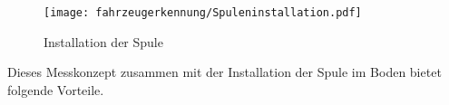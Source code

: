 \begin{figure}[H]
    \centering
    \texttt{[image: fahrzeugerkennung/Spuleninstallation.pdf]}
    \caption{Installation der Spule}
  \end{figure}
  Dieses Messkonzept zusammen mit der Installation der Spule im Boden bietet folgende Vorteile.

\begin{comment}

Bis auf die relative Permeabilität sind alle anderen Variablen konstant. Daraus lässt sich schlussfolgern, dass der magnetische
Fluss $\Phi$ anhand der Gleichung \ref{eq:phi} und \ref{eq:Rm} proportional zur relativen Permeabilität ist. 




\begin{equation} \label{iq:phi}
    \Phi \propto \mu_{r}
\end{equation}
Der Fluss $\Phi$ hängt somit auch von den Materialien ab durch die er fließt. In der nächsten Abbildung kann man erkennen,
wie ein Fahrzeug über eine im Boden installierte Spule den magnetischen Fluss $\Phi$ und somit die magnetische Flussdichte $B$
beeinflussen kann. 

\begin{figure}[H]
    \centering
    \texttt{[image: fahrzeugerkennung/Spuleninstallation.pdf]}
    \caption{Installation der Spule}
  \end{figure}
Um diese Größen auslesbar zu machen, müssen diese magnetischen Größen bei einer direkten Messung in elektrische Größen umgewandelt
werden.
Hierfür gelten folgende Zusammenhänge:

\begin{equation} \label{eq:L_phi}
    L = \frac{N \cdot \Phi}{I} = \frac{\Psi}{I} 
\end{equation}
Wobei \\
$L$ = Induktivität der Spule \\
$I$ = Strom der durch die Spule fließt \\
$N$ = Anzahl der Windungen der Spule \\
$\Psi$ = Verkettete Fluss

\pagebreak
\begin{equation} \label{eq:L_i}
    u(t) = L \cdot \frac{di(t)}{dt}
\end{equation}

Wobei \\
$L$ = Induktivität der Spule \\
$i(t)$ = Strom der durch die Spule fließt zum Zeitpunkt t \\
$u(t)$ = Spannung die an der Spule anliegt zum Zeitpunkt t \\
$t$ = Zeit in s \\
So lässt sich bei Bekanntheit von Strom und Spannung auf die Induktivität und mit der Gleichung \ref{eq:L_phi} 
und mit dem Zusammenhang \ref{iq:phi} auf die magnetischen Eigenschaften des Materials rückschließen. 
Diese Art der Detektion bietet viele praktische Vorteile.
\end{comment}
